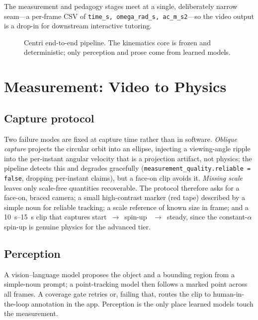 \documentclass[11pt]{article}
\begin{document}
The measurement and pedagogy stages meet at a single, deliberately narrow
seam---a per-frame CSV of \texttt{time\_s, omega\_rad\_s, ac\_m\_s2}---so the
video output is a drop-in for downstream interactive tutoring.

\begin{figure}[t]
  \centering
  \caption{Centri end-to-end pipeline. The kinematics core is frozen and
  deterministic; only perception and prose come from learned models.}
  \label{fig:pipeline}
\end{figure}

\section{Measurement: Video to Physics}
\subsection{Capture protocol}
Two failure modes are fixed at capture time rather than in software.
\emph{Oblique capture} projects the circular orbit into an ellipse, injecting
a viewing-angle ripple into the per-instant angular velocity that is a
projection artifact, not physics; the pipeline detects this and degrades
gracefully (\texttt{measurement\_quality.reliable = false}, dropping
per-instant claims), but a face-on clip avoids it. \emph{Missing scale} leaves
only scale-free quantities recoverable. The protocol therefore asks for a
face-on, braced camera; a small high-contrast marker (red tape) described by a
simple noun for reliable tracking; a scale reference of known size in frame;
and a \SIrange{10}{15}{\second} clip that captures start~$\rightarrow$~spin-up~%
$\rightarrow$~steady, since the constant-$\alpha$ spin-up is genuine physics
for the advanced tier.

\subsection{Perception}
A vision--language model proposes the object and a bounding region from a
simple-noun prompt; a point-tracking model then follows a marked point across
all frames. A coverage gate retries or, failing that, routes the clip to
human-in-the-loop annotation in the app. Perception is the only place learned
models touch the measurement.
\end{document}
